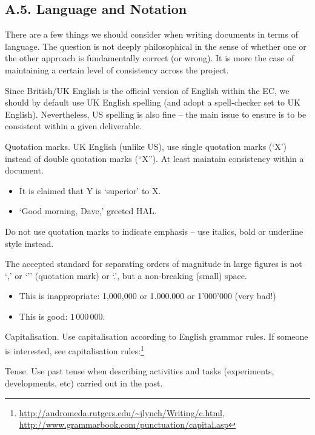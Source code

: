 \subsection*{A.5. Language and Notation}
\label{sec:appendix-a5-language-notation}

There are a few things we should consider when writing documents in terms of language. The question is not deeply philosophical in the sense of whether one or the other approach is fundamentally correct (or wrong). It is more the case of maintaining a certain level of consistency across the project.

Since British/UK English is the official version of English within the EC, we should by default use UK English spelling (and adopt a spell-checker set to UK English). Nevertheless, US spelling is also fine – the main issue to ensure is to be consistent within a given deliverable.

Quotation marks. UK English (unlike US), use single quotation marks (‘X’) instead of double quotation marks (``X''). At least maintain consistency within a document. 

\begin{itemize}
    \item It is claimed that Y is ‘superior’ to X. 
    \item ‘Good morning, Dave,’ greeted HAL.
\end{itemize}

Do not use quotation marks to indicate emphasis – use italics, bold or underline style instead.

The accepted standard for separating orders of magnitude in large figures is not ‘,’ or ‘’’ (quotation mark) or ‘.’, but a non-breaking (small) space. 

\begin{itemize}
    \item This is inappropriate: 1,000,000 or 1.000.000 or 1’000’000 (very bad!) 
    \item This is good: $1\,000\,000$. 
\end{itemize}

Capitalisation. Use capitalisation according to English grammar rules. If someone is interested, see 
capitalisation rules:\footnote{\url{http://andromeda.rutgers.edu/~jlynch/Writing/c.html}, \url{http://www.grammarbook.com/punctuation/capital.asp}}

Tense. Use past tense when describing activities and tasks (experiments, developments, etc) carried out in the past. 

